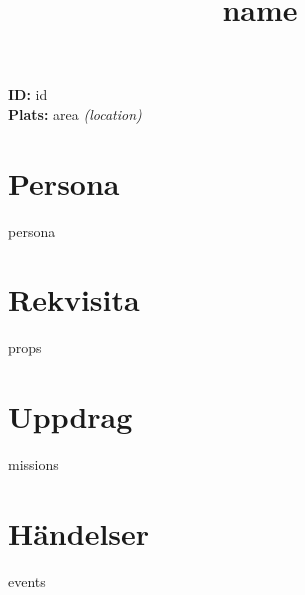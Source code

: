\documentclass{article}
\begin{document}
\title{ {{name}} }
\date{}
\maketitle

\textbf{ID:} {{id}} \\
\textbf{Plats:} {{area}} \textit{({{location}})} \\
\section{Persona} {{persona}}
\section{Rekvisita} {{props}}

\section{Uppdrag} {{missions}}
\section{Händelser} {{events}}
\end{document}
